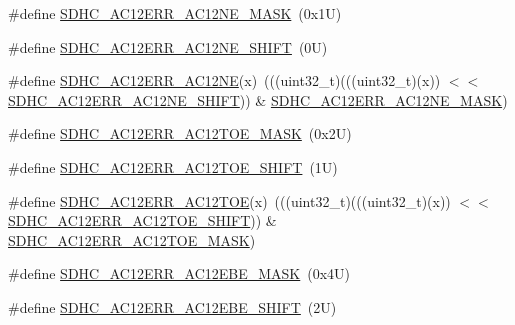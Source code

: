 \begin{DoxyCompactItemize}
\item 
\#define \mbox{\hyperlink{group___s_d_h_c___register___masks_ga41337efa0e8891905b61ceef4b4f20d4}{S\+D\+H\+C\+\_\+\+A\+C12\+E\+R\+R\+\_\+\+A\+C12\+N\+E\+\_\+\+M\+A\+SK}}~(0x1\+U)
\item 
\#define \mbox{\hyperlink{group___s_d_h_c___register___masks_ga5f00efec00a18073d07677099619160d}{S\+D\+H\+C\+\_\+\+A\+C12\+E\+R\+R\+\_\+\+A\+C12\+N\+E\+\_\+\+S\+H\+I\+FT}}~(0\+U)
\item 
\#define \mbox{\hyperlink{group___s_d_h_c___register___masks_ga9e13342e8ec4e6f74ac89d602ce6287e}{S\+D\+H\+C\+\_\+\+A\+C12\+E\+R\+R\+\_\+\+A\+C12\+NE}}(x)~(((uint32\+\_\+t)(((uint32\+\_\+t)(x)) $<$$<$ \mbox{\hyperlink{group___s_d_h_c___register___masks_ga5f00efec00a18073d07677099619160d}{S\+D\+H\+C\+\_\+\+A\+C12\+E\+R\+R\+\_\+\+A\+C12\+N\+E\+\_\+\+S\+H\+I\+FT}})) \& \mbox{\hyperlink{group___s_d_h_c___register___masks_ga41337efa0e8891905b61ceef4b4f20d4}{S\+D\+H\+C\+\_\+\+A\+C12\+E\+R\+R\+\_\+\+A\+C12\+N\+E\+\_\+\+M\+A\+SK}})
\item 
\#define \mbox{\hyperlink{group___s_d_h_c___register___masks_ga8e4439265574a0caa1a8bfa16f98d304}{S\+D\+H\+C\+\_\+\+A\+C12\+E\+R\+R\+\_\+\+A\+C12\+T\+O\+E\+\_\+\+M\+A\+SK}}~(0x2\+U)
\item 
\#define \mbox{\hyperlink{group___s_d_h_c___register___masks_ga9b67902a6fac916d2c9425c8262aebc5}{S\+D\+H\+C\+\_\+\+A\+C12\+E\+R\+R\+\_\+\+A\+C12\+T\+O\+E\+\_\+\+S\+H\+I\+FT}}~(1\+U)
\item 
\#define \mbox{\hyperlink{group___s_d_h_c___register___masks_ga9b2782e0f5f53a8633492fc91c0c5294}{S\+D\+H\+C\+\_\+\+A\+C12\+E\+R\+R\+\_\+\+A\+C12\+T\+OE}}(x)~(((uint32\+\_\+t)(((uint32\+\_\+t)(x)) $<$$<$ \mbox{\hyperlink{group___s_d_h_c___register___masks_ga9b67902a6fac916d2c9425c8262aebc5}{S\+D\+H\+C\+\_\+\+A\+C12\+E\+R\+R\+\_\+\+A\+C12\+T\+O\+E\+\_\+\+S\+H\+I\+FT}})) \& \mbox{\hyperlink{group___s_d_h_c___register___masks_ga8e4439265574a0caa1a8bfa16f98d304}{S\+D\+H\+C\+\_\+\+A\+C12\+E\+R\+R\+\_\+\+A\+C12\+T\+O\+E\+\_\+\+M\+A\+SK}})
\item 
\#define \mbox{\hyperlink{group___s_d_h_c___register___masks_ga20a7d6558b259a61499a0745f6450798}{S\+D\+H\+C\+\_\+\+A\+C12\+E\+R\+R\+\_\+\+A\+C12\+E\+B\+E\+\_\+\+M\+A\+SK}}~(0x4\+U)
\item 
\#define \mbox{\hyperlink{group___s_d_h_c___register___masks_gaa4872fca1b2f1ae350fcb6297e995469}{S\+D\+H\+C\+\_\+\+A\+C12\+E\+R\+R\+\_\+\+A\+C12\+E\+B\+E\+\_\+\+S\+H\+I\+FT}}~(2\+U)
\item 

\end{DoxyCompactItemize}
